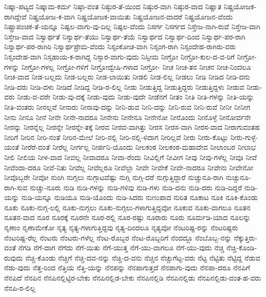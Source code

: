 {ನಿಷ್ಕಾ-ಪಟ್ಯದ
ನಿಷ್ಕಾಮ-ಕರ್ಮ
ನಿಷ್ಠಾ-ವಂತ
ನಿಷ್ಠುರ-ತೆ-ಯಿಂದ
ನಿಷ್ಠುರ-ವಾಗಿ
ನಿಷ್ಠುರ-ವಾದ
ನಿಷ್ಣಾತ
ನಿಷ್ಪ್ರಯೋಜಕ-ರಾಗಿದ್ದೇವೆ
ನಿಷ್ಪ್ರಯೋಜ-ಕ-ವಾಗಿ
ನಿಷ್ಪ್ರಯೋಜಕ-ವಾಯಿತು
ನಿಷ್ಪ್ರಯೋಜನ-ವಾದರೆ
ನಿಷ್ಪ್ರಯೋಜನ-ವೆಂದು
ನಿಷ್ಪ್ರಾಪಂಚಿಕ-ತೆ-ಯನ್ನೂ
ನಿಷ್ಫಲ-ವಾಗು-ವು-ದಿಲ್ಲ
ನಿಷ್ಫಲ-ವೆಂದು
ನಿಸರ್ಗ
ನಿಸರ್ಗದ
ನಿಸ್ತೇಜ-ನಾಗಿ-ರುವೆ
ನಿಸ್ತೇಜ-ವಾಗಿ
ನಿಸ್ತೇಜ-ವಾದ
ನಿಸ್ವಾರ್ಥತೆ
ನಿಸ್ವಾರ್ಥ-ತೆಯು
ನಿಸ್ವಾರ್ಥ-ತೆಯೆ
ನಿಸ್ವಾರ್ಥದ
ನಿಸ್ವಾರ್ಥ-ದಿಂದ
ನಿಸ್ವಾರ್ಥ-ಪರ-ರಾಗಿ
ನಿಸ್ವಾರ್ಥ-ಪರ-ರಾಗಿರಿ
ನಿಸ್ವಾರ್ಥಪ್ರೇಮ-ವೆಂದು
ನಿಸ್ಸಂಕೋಚ-ವಾಗಿ
ನಿಸ್ಸಂಗ-ರಾಗಿ
ನಿಸ್ಸಂದೇಹ-ರಾಗಿರು-ವರು
ನಿಸ್ಸಂದೇಹ-ವಾಗಿ
ನಿಸ್ಸಹಾಯ-ಕ-ರಾಗಿದ್ದ
ನಿಸ್ಸಾರ-ವಾಗು-ವುದು
ನಿಸ್ಸೀಮ
ನೀಗ್ರೋ
ನೀಗ್ರೋ-ಕುಲ-ದ-ವ-ರಿಗೆ
ನೀಗ್ರೋ-ಗಳನ್ನು
ನೀಗ್ರೋ-ಗಳಲ್ಲ
ನೀಗ್ರೋ-ಗಳಿಗೆ
ನೀಗ್ರೋದ್ವೇಷಿ-ಗಳಾದ
ನೀಗ್ರೋ-
ನೀಚ
ನೀಚ-ತನ
ನೀಚನ
ನೀಚ-ನಿಂದಲೂ
ನೀಚ-ವಾದ
ನೀಡ-ಬಲ್ಲದು
ನೀಡ-ಬಲ್ಲರು
ನೀಡ-ಲಾಯಿತು
ನೀಡಲಿ
ನೀಡ-ಲಿಲ್ಲ
ನೀಡಲು
ನೀಡಿ
ನೀಡಿದ
ನೀಡಿ-ದನು
ನೀಡಿ-ದರು
ನೀಡಿ-ದಳು
ನೀಡಿದೆ
ನೀಡಿದ್ದ
ನೀಡಿ-ರ-ಲಿಲ್ಲ
ನೀಡು
ನೀಡುತ್ತಿದ್ದ
ನೀಡುತ್ತಿದ್ದರು
ನೀಡುತ್ತಿದ್ದಳು
ನೀಡುವ
ನೀಡು-ವರು
ನೀಡು-ವ-ವರೇ
ನೀಡು-ವು-ದಕ್ಕೆ
ನೀಡು-ವುದು
ನೀಡು-ವುದೇ
ನೀಡೆನಗೆ
ನೀತಂ
ನೀತಿ
ನೀತಿ-ಗಳನ್ನು
ನೀತಿ-ಯನ್ನು
ನೀತಿ-ವಂತರು
ನೀನಲ್ಲವೆ
ನೀನಾರು
ನೀನಾವು-ದನ್ನು
ನೀನಿ-ಡುವ
ನೀನಿ-ದನ್ನು
ನೀನಿ-ರುವ
ನೀನಿ-ರುವೆ
ನೀನೀ
ನೀನೀಗ
ನೀನು
ನೀನೂ
ನೀನೆ
ನೀನೇ
ನೀನೇ-ನಾದರೂ
ನೀನೇನು
ನೀನೇನೂ
ನೀನೇನೋ
ನೀನೊಂದು
ನೀನೊಳ್ಳೆ
ನೀನೋರ್ವನೇ
ನೀರನ್ನು
ನೀರನ್ನೆಲ್ಲ
ನೀರನ್ನೇ
ನೀರನ್ನೇ-ತಕ್ಕೆ
ನೀರವ
ನೀರವ-ವಾಗಿತ್ತು
ನೀರಸ
ನೀರಸ-ವಾಗಿ
ನೀರಸ-ವಾದ
ನೀರಾಗುವಂತಹ
ನೀರಿಗೆ
ನೀರಿನ
ನೀರಿ-ನಂತೆ
ನೀರಿನ-ಮೇಲೆ
ನೀರಿ-ನಲ್ಲಿ
ನೀರಿ-ನಲ್ಲಿ-ಳಿದಾಗ
ನೀರಿಲ್ಲವೆ
ನೀರು
ನೀರು-ಕೊಟ್ಟು
ನೀರು-ಗುಳ್ಳೆ-ಯಂತೆ
ನೀರೆರೆ-ದಂತೆ
ನೀರೆಲ್ಲ
ನೀರ್ಗಲ್ಲ
ನೀರ್ಪನಿ-ಯೊಂದು
ನೀಲಕಂಠ
ನೀಲಕಂಠ-ಮಹಾದೇವ
ನೀಲಾಂಬರ
ನೀಲಾಭ
ನೀಲಿ
ನೀಲಿಯ
ನೀಳ-ವಾದ
ನೀವಲ್ಲ
ನೀವಾದರೂ
ನೀವಾ-ರೆಂದು
ನೀವಿಲ್ಲಿಗೆ
ನೀವೀಗ
ನೀವು
ನೀವು-ಗಳೆಲ್ಲ
ನೀವೂ
ನೀವೆ
ನೀವೆಂದಾ-ದರೂ
ನೀವೆ-ನಿತು
ನೀವೆಲ್ಲ
ನೀವೆಲ್ಲರೂ
ನೀವೆಲ್ಲಾ
ನೀವೇ
ನೀವೇಕೆ
ನೀವೇ-ನಾದರೂ
ನೀವೇನು
ನೀವೇನೋ
ನೀವೊಬ್ಬರೇ
ನೀವೋ
ನುಂಗಿ
ನುಗ್ಗಲು
ನುಗ್ಗಾಟವೆಷ್ಟು
ನುಗ್ಗಿ
ನುಗ್ಗಿ-ದರೆ
ನುಗ್ಗುತ್ತಿದ್ದಾರೆ
ನುಚ್ಚುನೂ-ರಾಗಿ
ನುಚ್ಚುನೂ-ರಾಗಿ-ಸುವ
ನುಚ್ಚು-ನೂರು
ನುಡಿ
ನುಡಿ-ಗಳನ್ನು
ನುಡಿ-ಗಳಿವು
ನುಡಿ-ಗಳು
ನುಡಿ-ದನು
ನುಡಿ-ದರು
ನುಡಿ-ದಿದ್ದರೆ
ನುಡಿ-ಯನ್ನು
ನುಡಿ-ಯನ್ನೂ
ನುಡಿಯೂ
ನುಡಿ-ಯೊಂದು
ನುಡಿ-ಸಿದರು
ನುಣುಪಾದ
ನುರಿತ
ನೂಕಾಟ
ನೂಕಿ
ನೂಕಿ-ಕೊಂಡು
ನೂಕು
ನೂಕು-ನುಗ್ಗ-ಲಲ್ಲಿ
ನೂಕು-ನುಗ್ಗಲು
ನೂಕು-ನುಗ್ಗಲು-ಗಳಾಗುತ್ತಿದ್ದವೋ
ನೂಕುವ
ನೂಕು-ವಾಗಲೂ
ನೂತನ
ನೂತನ-ವಾದ
ನೂರ
ನೂರಕ್ಕೆ
ನೂರನೇ
ನೂರ-ರಲ್ಲಿ
ನೂರ-ರಷ್ಟು
ನೂರಾರು
ನೂರು
ನೂರ್ಮಡಿ-ಯಾದ
ನೂಲನ್ನು
ನೃಣಾಂ
ನೃಣಾಮೇಕೋ
ನೃತ್ಯ
ನೃತ್ಯ-ಗಳಾಗುತ್ತಿದ್ದವು
ನೃತ್ಯ-ದಿಂದಲೂ
ನೃತ್ಯವೋ
ನೆಂಟರಿಷ್ಟ-ರನ್ನು
ನೆಂಟರಿಷ್ಟರು
ನೆಂಟರಿಷ್ಟ-ರೆಲ್ಲ
ನೆಂಟರು
ನೆಂಟರು-ಗಳೆಲ್ಲ
ನೆಂಟ-ರೊಬ್ಬರ
ನೆಂಟ-ರೊಬ್ಬರಿಗೆ
ನೆಂದದ್ದೂ
ನೆಂಬೊಬ್ಬ-ನನ್ನು
ನೆಕ್ಕುತ್ತಿರು-ವಂತೆ
ನೆಗಡಿ
ನೆಗೆ-ದಾಗ
ನೆಗೆದು
ನೆಗೆ-ಯಿತು
ನೆಗೆ-ಯುತ್ತ
ನೆಗೆ-ಯು-ವಾಗಲೂ
ನೆಗೆ-ಯು-ವುದು
ನೆಚ್ಚಿ
ನೆಚ್ಚಿ-ಕೊಂಡಿ-ರುವುದು
ನೆಚ್ಚಿ-ಕೊಂಡು
ನೆಚ್ಚಿಗೆ
ನೆಚ್ಚಿ-ದವ-ನನ್ನು
ನೆಚ್ಚಿ-ದ-ವನು
ನೆಚ್ಚಿನ
ನೆಚ್ಚುಗೆಟ್ಟ-ವರು
ನೆಟ್ಟ
ನೆಟ್ಟಿತು
ನೆಟ್ಟಿದ್ದ
ನೆಡುವ
ನೆಡು-ವುದು
ನೆತ್ತ-ರಿಂದ
ನೆತ್ತಿಯ
ನೆತ್ತಿ-ಯನ್ನು
ನೆನಪನ್ನು
ನೆನಪಾಗುತ್ತದೆ
ನೆನಪಾಗು-ವುದು
ನೆನಪಾ-ದರೂ
ನೆನಪಿಗೆ
ನೆನಪಿದೆ
ನೆನಪಿನ
ನೆನಪಿನಲ್ಲಿಟ್ಟಿರ-ಬೇಕು
ನೆನಪಿನಲ್ಲಿಡ-ಬೇಕು
ನೆನಪಿನಲ್ಲಿಡಿ
ನೆನಪಿನಲ್ಲಿಡು
ನೆನಪಿನಲ್ಲಿಡು-ವಂತ-ಹ-ವರು
ನೆನಪಿ-ರ-ಲಿಲ್ಲ
}
